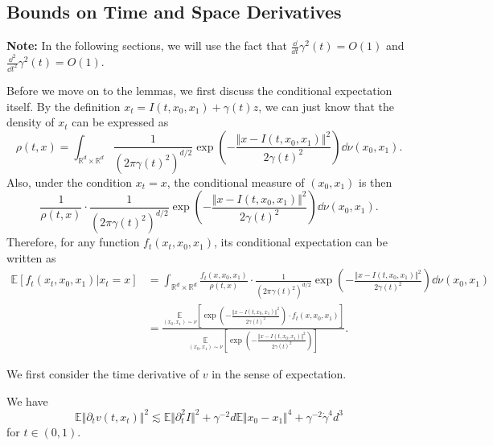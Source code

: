 \subsection{Bounds on Time and Space Derivatives}

\textbf{Note:} In the following sections, we will use the fact that $\frac{\dd}{\dd t}\gamma^2(t)=O(1)$ and $\frac{\dd^2}{\dd t^2}\gamma^2(t)=O(1)$.

Before we move on to the lemmas, we first discuss the conditional expectation itself. By the definition $x_t=I(t,x_0,x_1)+\gamma(t)z$, we can just know that the density of $x_t$ can be expressed as
$$\rho(t,x)=\int_{\mathbb{R}^d\times\mathbb{R}^d}\frac{1}{(2\pi\gamma(t)^2)^{d/2}}\exp\left(-\frac{\Vert x-I(t,x_0,x_1)\Vert^2}{2\gamma(t)^2}\right)\dd\nu(x_0,x_1).$$
Also, under the condition $x_t=x$, the conditional measure of $(x_0,x_1)$ is then 
$$\frac{1}{\rho(t,x)}\cdot\frac{1}{(2\pi\gamma(t)^2)^{d/2}}\exp\left(-\frac{\Vert x-I(t,x_0,x_1)\Vert^2}{2\gamma(t)^2}\right)\dd\nu(x_0,x_1).$$
Therefore, for any function $f_t(x_t,x_0,x_1)$, its conditional expectation can be written as
$$\begin{aligned}
    \mathbb{E}[f_t(x_t,x_0,x_1)|x_t=x]&=\int_{\mathbb{R}^d\times\mathbb{R}^d}\frac{f_t(x,x_0,x_1)}{\rho(t,x)}\cdot\frac{1}{(2\pi\gamma(t)^2)^{d/2}}\exp\left(-\frac{\Vert x-I(t,x_0,x_1)\Vert^2}{2\gamma(t)^2}\right)\dd\nu(x_0,x_1)\\
    &=\frac{\underset{(x_0,x_1)\sim\nu}{\mathbb{E}}\left[\exp\left(-\frac{\Vert x-I(t,x_0,x_1)\Vert^2}{2\gamma(t)^2}\right)\cdot f_t(x,x_0,x_1)\right]}{\underset{(x_0,x_1)\sim\nu}{\mathbb{E}}\left[\exp\left(-\frac{\Vert x-I(t,x_0,x_1)\Vert^2}{2\gamma(t)^2}\right)\right]}.
\end{aligned}$$

We first consider the time derivative of $v$ in the sense of expectation.

\begin{lemma}
    We have $$\mathbb{E}\Vert\partial_tv(t,x_t)\Vert^2\lesssim\mathbb{E}\Vert\partial_t^2I\Vert^2+\gamma^{-2}d\mathbb{E}\Vert x_0-x_1\Vert^4+\gamma^{-2}\dot{\gamma}^4d^3$$
for $t\in(0,1)$.
    \label{lem:v-time}
\end{lemma}

